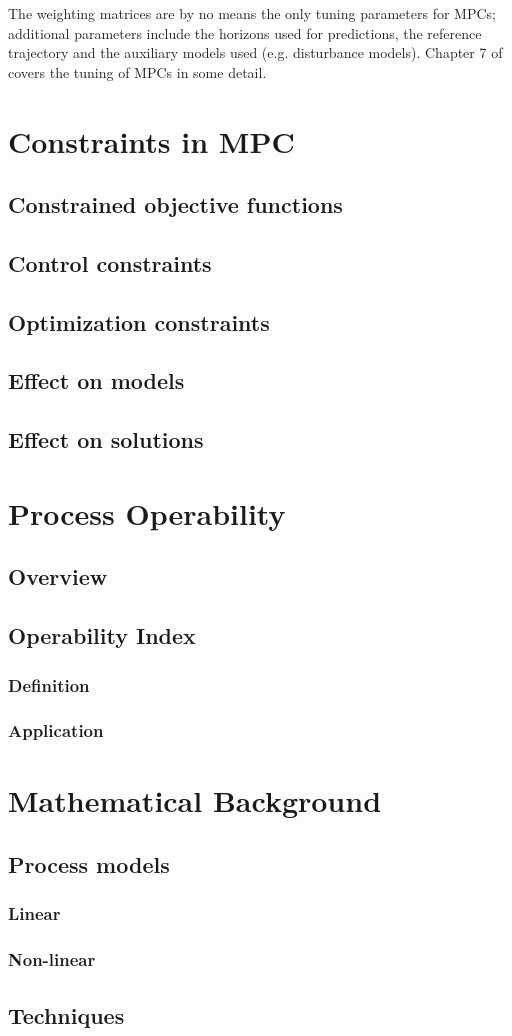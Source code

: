 The weighting matrices are by no means the only tuning parameters for MPCs;
additional parameters include the horizons used for predictions, the reference
trajectory and the auxiliary models used (e.g. disturbance models). Chapter 7
of \citet{maciejowskimpc} covers the tuning of MPCs in some detail.

\section{Constraints in MPC}
\subsection{Constrained objective functions}\label{sec:conobjfn}
\subsection{Control constraints}
\subsection{Optimization constraints}
\subsection{Effect on models}
\subsection{Effect on solutions}

\section{Process Operability}
\subsection{Overview}
\subsection{Operability Index}
\subsubsection{Definition}
\subsubsection{Application}

\section{Mathematical Background}
\subsection{Process models}
\subsubsection{Linear}
\subsubsection{Non-linear}
\subsection{Techniques}
